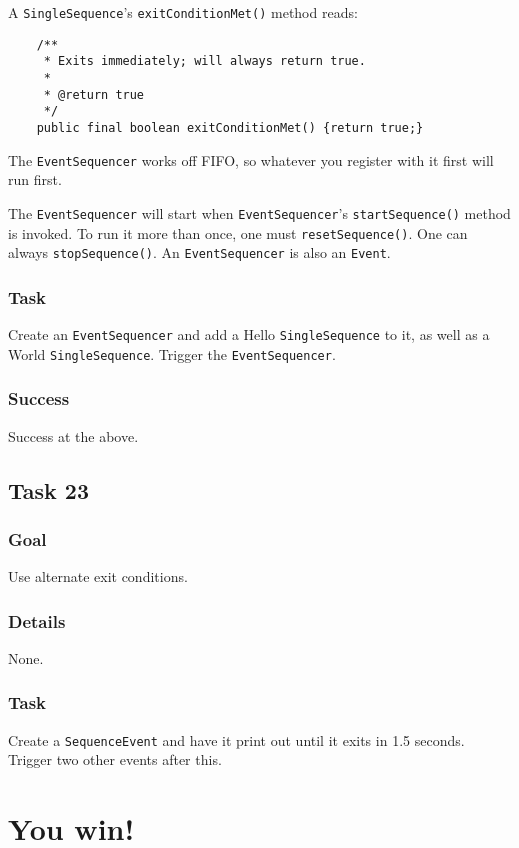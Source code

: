\documentclass[a4paper]{article}
\begin{document}
A \lstinline{SingleSequence}'s \lstinline{exitConditionMet()} method reads:

\begin{verbatim}
	/**
	 * Exits immediately; will always return true.
	 * 
	 * @return true
	 */
	public final boolean exitConditionMet() {return true;}
\end{verbatim}

The \lstinline{EventSequencer} works off FIFO, so whatever you register with it first will run first.

The \lstinline{EventSequencer} will start when \lstinline{EventSequencer}'s \lstinline{startSequence()} method is invoked. To run it more than once, one must \lstinline{resetSequence()}. One can always \lstinline{stopSequence()}. An \lstinline{EventSequencer} is also an \lstinline{Event}.
\subsubsection{Task} Create an \lstinline{EventSequencer} and add a Hello \lstinline{SingleSequence} to it, as well as a World \lstinline{SingleSequence}. Trigger the \lstinline{EventSequencer}.
\subsubsection{Success} Success at the above.

\subsection{Task 23}
\subsubsection{Goal} Use alternate exit conditions.
\subsubsection{Details} None.
\subsubsection{Task} Create a \lstinline{SequenceEvent} and have it print out until it exits in 1.5 seconds. Trigger two other events after this.

\section*{You win!}
\end{document}
